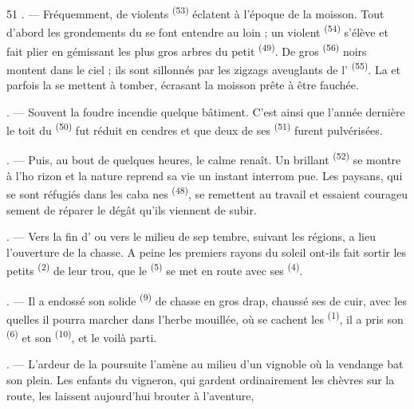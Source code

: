 \begin{VUpage}[53]{51}
. --- Fréquemment, de violents  \textsuperscript{(53)}\nl
éclatent à l'époque de la moisson. Tout d'abord les\nl
grondements du  se font entendre au loin ;\nl
un violent  \textsuperscript{(54)} s'élève et fait plier en\nl
gémissant les plus gros arbres du petit  \textsuperscript{(49)}. De\nl
gros  \textsuperscript{(56)} noirs montent dans le ciel ; ils sont\nl
sillonnés par les zigzags aveuglants de l' \textsuperscript{(55)}.\nl
La  et parfois la  se mettent à tomber,\nl
écrasant la moisson prête à être fauchée.

. --- Souvent la foudre incendie quelque bâtiment.\nl
C'est ainsi que l'année dernière le toit du \nl
{} \textsuperscript{(50)} fut réduit en cendres et que deux de ses\nl
{} \textsuperscript{(51)} furent pulvérisées.

. --- Puis, au bout de quelques heures, le calme\nl
renaît. Un brillant  \textsuperscript{(52)} se montre à l'ho\cc
rizon et la nature reprend sa vie un instant interrom\cc
pue. Les paysans, qui se sont réfugiés dans les caba\cc
nes \textsuperscript{(48)}, se remettent au travail et essaient courageu\cc
sement de réparer le dégât qu'ils viennent de subir.

\VUsaut{5.4mm}
\VUsaut{2.2mm}

\VUsaut{4.0mm}

. --- Vers la fin d' ou vers le milieu de sep\cc
tembre, suivant les régions, a lieu l'ouverture de la\nl
chasse. A peine les premiers rayons du soleil ont-ils\nl
fait sortir les petits  \textsuperscript{(2)} de leur trou, que le\nl
{} \textsuperscript{(5)} se met en route avec ses  \textsuperscript{(4)}.

. --- Il a endossé son solide  \textsuperscript{(9)} de chasse\nl
en gros drap, chaussé ses  de cuir, avec les\cc
quelles il pourra marcher dans l'herbe mouillée, où se\nl
cachent les  \textsuperscript{(1)}, il a pris son  \textsuperscript{(6)} et\nl
son  \textsuperscript{(10)}, et le voilà parti.

. --- L'ardeur de la poursuite l'amène au milieu d'un\nl
vignoble où la vendange bat son plein. Les enfants du\nl
vigneron, qui gardent ordinairement les chèvres sur\nl
la route, les laissent aujourd'hui brouter à l'aventure,
\parplein
\end{VUpage}


